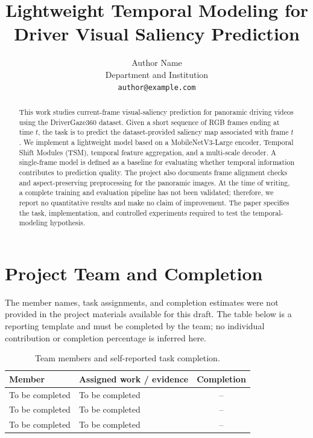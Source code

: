 \documentclass[10pt,twocolumn,letterpaper]{article}
\begin{document}
\title{Lightweight Temporal Modeling for Driver Visual Saliency Prediction}

\author{
Author Name\\
Department and Institution\\
{\tt\small author@example.com}
}
\maketitle

\begin{abstract}
This work studies current-frame visual-saliency prediction for panoramic
driving videos using the DriverGaze360 dataset. Given a short sequence of RGB
frames ending at time \(t\), the task is to predict the dataset-provided
saliency map associated with frame \(t\). We implement a lightweight model
based on a MobileNetV3-Large encoder, Temporal Shift Modules (TSM), temporal
feature aggregation, and a multi-scale decoder. A single-frame model is
defined as a baseline for evaluating whether temporal information contributes
to prediction quality. The project also documents frame alignment checks and
aspect-preserving preprocessing for the panoramic images. At the time of
writing, a complete training and evaluation pipeline has not been validated;
therefore, we report no quantitative results and make no claim of
improvement. The paper specifies the task, implementation, and controlled
experiments required to test the temporal-modeling hypothesis.
\end{abstract}

\section{Project Team and Completion}
\label{sec:team}

The member names, task assignments, and completion estimates were not
provided in the project materials available for this draft. The table below
is a reporting template and must be completed by the team; no individual
contribution or completion percentage is inferred here.

\begin{table}[t]
    \centering
    \caption{Team members and self-reported task completion.}
    \label{tab:team}
    \small
    \begin{tabularx}{\linewidth}{l X c}
        \toprule
        Member & Assigned work / evidence & Completion \\
        \midrule
        To be completed & To be completed & -- \\
        To be completed & To be completed & -- \\
        To be completed & To be completed & -- \\
        \bottomrule
    \end{tabularx}
\end{table}
\end{document}
